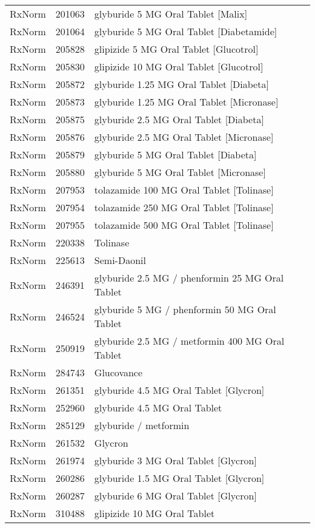 \begin{longtable}{p{}p{}p{}}
  RxNorm & 201063 & glyburide 5 MG Oral Tablet [Malix] \\ 
  RxNorm & 201064 & glyburide 5 MG Oral Tablet [Diabetamide] \\ 
  RxNorm & 205828 & glipizide 5 MG Oral Tablet [Glucotrol] \\ 
  RxNorm & 205830 & glipizide 10 MG Oral Tablet [Glucotrol] \\ 
  RxNorm & 205872 & glyburide 1.25 MG Oral Tablet [Diabeta] \\ 
  RxNorm & 205873 & glyburide 1.25 MG Oral Tablet [Micronase] \\ 
  RxNorm & 205875 & glyburide 2.5 MG Oral Tablet [Diabeta] \\ 
  RxNorm & 205876 & glyburide 2.5 MG Oral Tablet [Micronase] \\ 
  RxNorm & 205879 & glyburide 5 MG Oral Tablet [Diabeta] \\ 
  RxNorm & 205880 & glyburide 5 MG Oral Tablet [Micronase] \\ 
  RxNorm & 207953 & tolazamide 100 MG Oral Tablet [Tolinase] \\ 
  RxNorm & 207954 & tolazamide 250 MG Oral Tablet [Tolinase] \\ 
  RxNorm & 207955 & tolazamide 500 MG Oral Tablet [Tolinase] \\ 
  RxNorm & 220338 & Tolinase \\ 
  RxNorm & 225613 & Semi-Daonil \\ 
  RxNorm & 246391 & glyburide 2.5 MG / phenformin 25 MG Oral Tablet \\ 
  RxNorm & 246524 & glyburide 5 MG / phenformin 50 MG Oral Tablet \\ 
  RxNorm & 250919 & glyburide 2.5 MG / metformin 400 MG Oral Tablet \\ 
  RxNorm & 284743 & Glucovance \\ 
  RxNorm & 261351 & glyburide 4.5 MG Oral Tablet [Glycron] \\ 
  RxNorm & 252960 & glyburide 4.5 MG Oral Tablet \\ 
  RxNorm & 285129 & glyburide / metformin \\ 
  RxNorm & 261532 & Glycron \\ 
  RxNorm & 261974 & glyburide 3 MG Oral Tablet [Glycron] \\ 
  RxNorm & 260286 & glyburide 1.5 MG Oral Tablet [Glycron] \\ 
  RxNorm & 260287 & glyburide 6 MG Oral Tablet [Glycron] \\ 
  RxNorm & 310488 & glipizide 10 MG Oral Tablet \\ 

\end{longtable}
